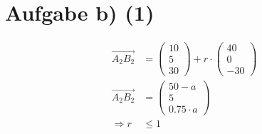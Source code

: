 \documentclass[12pt,a4paper]{report}
\begin{document}
\section{Aufgabe b) (1)}
\begin{align*}
	\overrightarrow{A_2B_2} &= \begin{pmatrix}
 		10\\5\\30	
	\end{pmatrix} + r \cdot \begin{pmatrix}
		40 \\0 \\-30
	\end{pmatrix} \\
	\overrightarrow{A_2B_2} &= \begin{pmatrix}
		50-a \\5\\0.75\cdot a
	\end{pmatrix} \\
	\Rightarrow r &\leq 1
\end{align*}
\end{document}
